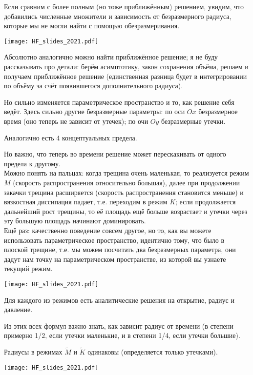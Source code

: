 \documentclass[main.tex]{subfiles}
\begin{document}
Если сравним с более полным (но тоже приближённым) решением, увидим, что добавились численные множители и зависимость от безразмерного радиуса, которые мы не могли найти с помощью обезразмеривания.

\texttt{[image: HF\_slides\_2021.pdf]}

Абсолютно аналогично можно найти приближённое решение; я не буду рассказывать про детали: берём асимптотику, закон сохранения объёма, решаем и получаем приближённое решение (единственная разница будет в интегрировании по объёму за счёт появившегося дополнительного радиуса).

Но сильно изменяется параметрическое пространство и то, как решение себя ведёт.
Здесь сильно другие безразмерные параметры: по оси $Ox$ безразмерное время (оно теперь не зависит от утечек); по очи $Oy$ безразмерные утечки.

Аналогично есть 4 концептуальных предела.

Но важно, что теперь во времени решение может перескакивать от одного предела к другому.
\\

Можно понять на пальцах: когда трещина очень маленькая, то реализуется режим $M$ (скорость распространения относительно большая), далее при продолжении закачки трещина расширяется (скорость распространения становится меньше) и вязкостная диссипация падает, т.е. переходим в режим $K$; если продолжается дальнейший рост трещины, то её площадь ещё больше возрастает и утечки через эту большую площадь начинают доминировать.
\\

Ещё раз: качественно поведение совсем другое, но то, как вы можете использовать параметрическое пространство, идентично тому, что было в плоской трещине, т.е. мы можем посчитать два безразмерных параметра, они дадут нам точку на параметрическом пространстве, из которой вы узнаете текущий режим.

\texttt{[image: HF\_slides\_2021.pdf]}

Для каждого из режимов есть аналитические решения на открытие, радиус и давление.

Из этих всех формул важно знать, как зависит радиус от времени (в степени примерно 1/2, если утечки маленькие, и в степени 1/4, если утечки большие).

Радиусы в режимах $\tilde{M}$ и $\tilde{K}$ одинаковы (определяется только утечками).

\texttt{[image: HF\_slides\_2021.pdf]}
\end{document}
